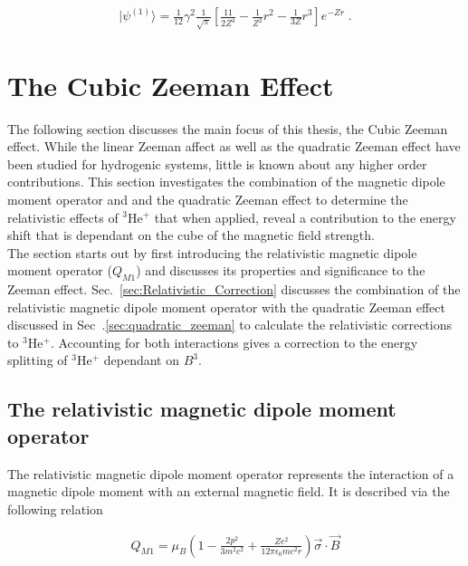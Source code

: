         \begin{align}
            \vert \psi^{(1)} \rangle = \frac{1}{12}\gamma^2 \frac{1}{\sqrt{\pi}} \left[\frac{11}{2 Z^4} - \frac{1}{Z^2} r^2 -\frac{1}{3Z} r^3 \right] e^{-Zr} \;. \label{psi_1_result}
        \end{align}



    \section{The Cubic Zeeman Effect}
        The following section discusses the main focus of this thesis, the Cubic Zeeman effect. While the linear Zeeman affect as well as the quadratic Zeeman effect have been studied for hydrogenic systems, little is known about any higher order contributions. This section investigates the combination of the magnetic dipole moment operator and and the quadratic Zeeman effect to determine the relativistic effects of $^3$He$^+$ that when applied, reveal a contribution to the energy shift that is dependant on the cube of the magnetic field strength.\\

        The section starts out by first introducing the relativistic magnetic dipole moment operator ($Q_{M1}$) and discusses its properties and significance to the Zeeman effect. Sec.~\ref{sec:Relativistic_Correction} discusses the combination of the relativistic magnetic dipole moment operator with the quadratic Zeeman effect discussed in Sec~.\ref{sec:quadratic_zeeman} to calculate the relativistic corrections to $^3$He$^+$. Accounting for both interactions gives a correction to the energy splitting of $^3$He$^+$ dependant on $B^3$.

        \subsection{The relativistic magnetic dipole moment operator}\label{sec:magnetic_dipole_operator}
            The relativistic magnetic dipole moment operator represents the interaction of a magnetic dipole moment with an external magnetic field. It is described via the following relation

            \begin{align}
                Q_{M1} = \mu_B \left( 1 - \frac{2p^2}{3m^2 c^2} + \frac{Ze^2}{12\pi \epsilon_0 mc^2r} \right) \vec{\sigma} \cdot \vec{B}
            \end{align}

